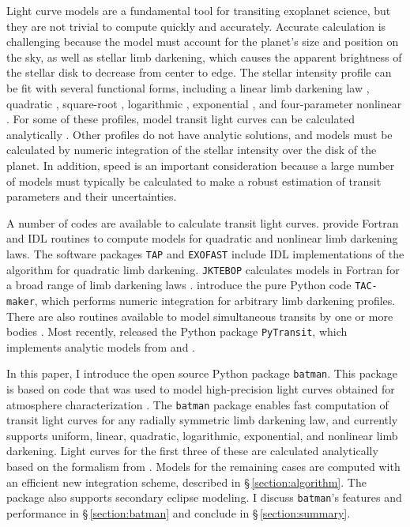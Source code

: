 \documentclass[12pt,preprint]{aastex}
\begin{document}
Light curve models are a fundamental tool for transiting exoplanet science, but they are not trivial to compute quickly and accurately.  Accurate calculation is challenging because the model must account for the planet's size and position on the sky, as well as stellar limb darkening, which causes the apparent brightness of the stellar disk to decrease from center to edge.  The  stellar intensity profile can be fit with several functional forms, including a linear limb darkening law \citep{schwarzschild06}, quadratic \citep{kopal50}, square-root \citep{diaz-cordoves92}, logarithmic \citep{klinglesmith70}, exponential \citep{claret03}, and four-parameter nonlinear \citep{claret00}.  For some of these profiles, model transit light curves can be calculated analytically \citep{mandel02, gimenez06, abubekerov13}.  Other profiles do not have analytic solutions, and models must be calculated by numeric integration of the stellar intensity over the disk of the planet. In addition, speed is an important consideration because a large number of models must typically be calculated to make a robust estimation of transit parameters and their uncertainties.

A number of codes are available to calculate transit light curves. \cite{mandel02} provide Fortran and IDL routines to compute models for quadratic and nonlinear limb darkening laws. The software packages \texttt{TAP} \citep{gazak12} and \texttt{EXOFAST} \citep{eastman13} include IDL implementations of the \cite{mandel02} algorithm for quadratic limb darkening. \texttt{JKTEBOP} calculates models in Fortran for a broad range of limb darkening laws \citep{southworth04}. \cite{kjurkchieva13} introduce the pure Python code \texttt{TAC-maker}, which performs numeric integration for arbitrary limb darkening profiles. There are also routines available to model simultaneous transits by one or more bodies \citep{kipping11, pal12}.  Most recently, \cite{parvianinen15} released the Python package \texttt{PyTransit}, which implements analytic models from \cite{mandel02} and \cite{gimenez06}.  

In this paper, I introduce the open source Python package \texttt{batman}.  This package is based on code that was used to model high-precision light curves obtained for atmosphere characterization \citep{kreidberg14b, kreidberg14a, kreidberg15, stevenson14c, stevenson14b, stevenson14a, stevenson14d}.  The \texttt{batman} package enables fast computation of transit light curves for any radially symmetric limb darkening law, and currently supports uniform, linear, quadratic, logarithmic, exponential, and nonlinear limb darkening. Light curves for the first three of these are calculated analytically based on the formalism from \cite{mandel02}.  Models for the remaining cases are computed with an efficient new integration scheme, described in \S\,\ref{section:algorithm}. The package also supports secondary eclipse modeling. I discuss \texttt{batman}'s features and performance in \S\,\ref{section:batman} and conclude in \S\,\ref{section:summary}.
\end{document}
